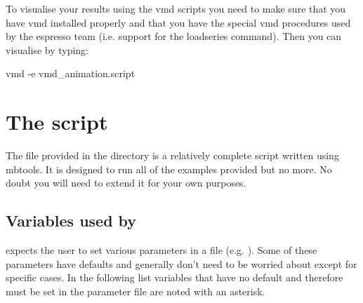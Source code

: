To visualise your results using the vmd scripts you need to make sure
that you have vmd installed properly and that you have the special vmd
procedures used by the espresso team (i.e. support for the loadseries
command). Then you can visualise by typing:

\begin{code}
  vmd -e vmd_animation.script
\end{code}  

\section{The  script}

The  file provided in the 
directory is a relatively complete script written using mbtools. It is
designed to run all of the examples provided but no more. No doubt you
will need to extend it for your own purposes.

\subsection{Variables used by }

 expects the user to set various parameters in a
 file (e.g. ). Some
of these parameters have defaults and generally don't need to be
worried about except for specific cases. In the following list
variables that have no default and therefore must be set in the
parameter file are noted with an asterisk.

